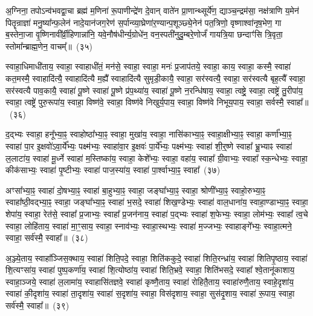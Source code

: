 {\anuvakamend[{अ॒ग्नि॒ष्टो॒मो वि॑शत्व॒ष्टाद॑श च}]}%

अ॒ग्निना॒ तपो\-ऽन्व॑भवद्वा॒चा ब्रह्म॑ म॒णिना॑ रू॒पाणीन्द्रे॑ण दे॒वान् वाते॑न प्रा॒णान्थ्सूर्ये॑ण॒ द्याञ्च॒न्द्रम॑सा॒ नक्ष॑त्राणि य॒मेन॑ पितॄन्राज्ञा॑ मनु॒ष्या᳚न्फ॒लेन॑ नादे॒यान॑जग॒रेण॑ स॒र्पान्व्या॒घ्रेणा॑र॒ण्यान्प॒शूञ्छ्ये॒नेन॑ पत॒त्रिणो॒ वृष्णाश्वा॑नृष॒भेण॒ गा ब॒स्तेना॒जा वृ॒ष्णिनावी᳚र्व्री॒हिणान्ना॑नि॒ यवे॒नौष॑धीर्न्य॒ग्रोधे॑न॒ वन॒स्पती॑नुदु॒म्बरे॒णोर्जं॑ गायत्रि॒या छन्दाꣳ॑सि त्रि॒वृता॒ स्तोमा᳚न्ब्राह्म॒णेन॒ वाचम्᳚॥~(३५)

{\anuvakamend[{ब्रा॒ह्म॒णेनैक॑ञ्च}]}%

स्वाहा॒धिमाधी॑ताय॒ स्वाहा॒ स्वाहाधी॑तं॒ मन॑से॒ स्वाहा॒ स्वाहा॒ मनः॑ प्र॒जा\-प॑तये॒ स्वाहा॒ काय॒ स्वाहा॒ कस्मै॒ स्वाहा॑ कत॒मस्मै॒ स्वाहादि॑त्यै॒ स्वाहादि॑त्यै म॒ह्यै᳚ स्वाहादि॑त्यै सुमृडी॒कायै॒ स्वाहा॒ सर॑स्वत्यै॒ स्वाहा॒ सर॑स्वत्यै बृह॒त्यै᳚ स्वाहा॒ सर॑स्वत्यै पाव॒कायै॒ स्वाहा॑ पू॒ष्णे स्वाहा॑ पू॒ष्णे प्र॑प॒थ्या॑य॒ स्वाहा॑ पू॒ष्णे न॒रन्धि॑षाय॒ स्वाहा॒ त्वष्ट्रे॒ स्वाहा॒ त्वष्ट्रे॑ तु॒रीपा॑य॒ स्वाहा॒ त्वष्ट्रे॑ पुरु॒रूपा॑य॒ स्वाहा॒ विष्ण॑वे॒ स्वाहा॒ विष्ण॑वे निखुर्य॒पाय॒ स्वाहा॒ विष्ण॑वे निभूय॒पाय॒ स्वाहा॒ सर्वस्मै॒ स्वाहा᳚॥~(३६)

{\anuvakamend[{पु॒रु॒रूपा॑य॒ स्वाहा॒ दश॑ च}]}%

द॒द्भ्यः स्वाहा॒ हनू᳚भ्या॒ꣴ॒ स्वाहोष्ठा᳚भ्या॒ꣴ॒ स्वाहा॒ मुखा॑य॒ स्वाहा॒ नासि॑काभ्या॒ꣴ॒ स्वाहा॒क्षीभ्या॒ꣴ॒ स्वाहा॒ कर्णा᳚भ्या॒ꣴ॒ स्वाहा॑ पा॒र इ॒क्षवो॑\-ऽवा॒र्ये᳚भ्यः॒ पक्ष्म॑भ्यः॒ स्वाहा॑वा॒र इ॒क्षवः॑ पा॒र्ये᳚भ्यः॒ पक्ष्म॑भ्यः॒ स्वाहा॑ शी॒र्॒\mbox{}ष्णे स्वाहा᳚ भ्रू॒भ्याꣴ स्वाहा॑ ल॒लाटा॑य॒ स्वाहा॑ मू॒र्ध्ने स्वाहा॑ म॒स्तिष्का॑य॒ स्वाहा॒ केशे᳚भ्यः॒ स्वाहा॒ वहा॑य॒ स्वाहा᳚ ग्री॒वाभ्यः॒ स्वाहा᳚ स्क॒न्धेभ्यः॒ स्वाहा॒ कीक॑साभ्यः॒ स्वाहा॑ पृ॒ष्टीभ्यः॒ स्वाहा॑ पाज॒स्या॑य॒ स्वाहा॑ पा॒र्श्वाभ्या॒ꣴ॒ स्वाहा᳚~(३७)

अꣳसा᳚भ्या॒ꣴ॒ स्वाहा॑ दो॒षभ्या॒ꣴ॒ स्वाहा॑ बा॒हुभ्या॒ꣴ॒ स्वाहा॒ जङ्घा᳚भ्या॒ꣴ॒ स्वाहा॒ श्रोणी᳚भ्या॒ꣴ॒ स्वाहो॒रुभ्या॒ꣴ॒ स्वाहा᳚ष्ठी॒वद्भ्या॒ꣴ॒ स्वाहा॒ जङ्घा᳚भ्या॒ꣴ॒ स्वाहा॑ भ॒सदे॒ स्वाहा॑ शिख॒ण्डेभ्यः॒ स्वाहा॑ वाल॒धाना॑य॒ स्वाहा॒ण्डाभ्या॒ꣴ॒ स्वाहा॒ शेपा॑य॒ स्वाहा॒ रेत॑से॒ स्वाहा᳚ प्र॒जाभ्यः॒ स्वाहा᳚ प्र॒जन॑नाय॒ स्वाहा॑ प॒द्भ्यः स्वाहा॑ श॒फेभ्यः॒ स्वाहा॒ लोम॑भ्यः॒ स्वाहा᳚ त्व॒चे स्वाहा॒ लोहि॑ताय॒ स्वाहा॑ मा॒ꣳ॒साय॒ स्वाहा॒ स्नाव॑भ्यः॒ स्वाहा॒स्थभ्यः॒ स्वाहा॑ म॒ज्जभ्यः॒ स्वाहाङ्गे᳚भ्यः॒ स्वाहा॒त्मने॒ स्वाहा॒ सर्व॑स्मै॒ स्वाहा᳚॥~(३८)

{\anuvakamend[{पा॒र्श्वाभ्या॒ꣴ॒ स्वाहा॑ म॒ज्जभ्यः॒ स्वाहा॒ षट्च॑}]}%

अ॒ञ्ज्ये॒ताय॒ स्वाहा᳚ञ्जिस॒क्थाय॒ स्वाहा॑ शिति॒पदे॒ स्वाहा॒ शिति॑ककुदे॒ स्वाहा॑ शिति॒रन्ध्रा॑य॒ स्वाहा॑ शितिपृ॒ष्ठाय॒ स्वाहा॑ शि॒त्यꣳसा॑य॒ स्वाहा॑ पुष्प॒कर्णा॑य॒ स्वाहा॑ शि॒त्योष्ठा॑य॒ स्वाहा॑ शिति॒भ्रवे॒ स्वाहा॒ शिति॑भसदे॒ स्वाहा᳚ श्वे॒तानू॑काशाय॒ स्वाहा॒ञ्जये॒ स्वाहा॑ ल॒लामा॑य॒ स्वाहासि॑तज्ञवे॒ स्वाहा॑ कृष्णै॒ताय॒ स्वाहा॑ रोहितै॒ताय॒ स्वाहा॑रुणै॒ताय॒ स्वाहे॒दृशा॑य॒ स्वाहा॑ की॒दृशा॑य॒ स्वाहा॑ ता॒दृशा॑य॒ स्वाहा॑ स॒दृशा॑य॒ स्वाहा॒ विस॑दृशाय॒ स्वाहा॒ सुस॑दृ॒शाय॒ स्वाहा॑ रू॒पाय॒ स्वाहा॒ सर्व॑स्मै॒ स्वाहा᳚॥~(३९)

